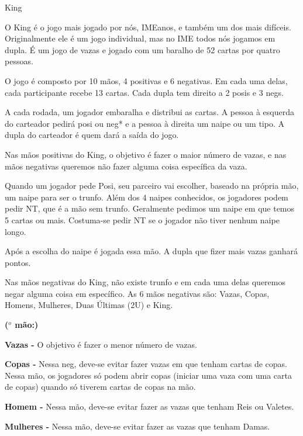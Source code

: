\begin{subsecao}{King}

O King é o jogo mais jogado por nós, IMEanos, e também um dos mais difíceis.
Originalmente ele é um jogo individual, mas no IME todos nós jogamos em
dupla. É um jogo de vazas e jogado com um baralho de 52 cartas por quatro
pessoas.

O jogo é composto por 10 mãos, 4 positivas e 6 negativas. Em cada uma delas,
cada participante recebe 13 cartas. Cada dupla tem direito a 2 posis e 3 negs.

A cada rodada, um jogador embaralha e distribui as cartas. A pessoa à esquerda
do carteador pedirá posi ou neg* e a pessoa à direita um naipe ou um tipo. A
dupla do carteador é quem dará a saída do jogo.

Nas mãos positivas do King, o objetivo é fazer o maior número de vazas, e nas
mãos negativas queremos não fazer alguma coisa específica da vaza.

Quando um jogador pede Posi, seu parceiro vai escolher, baseado na própria
mão, um naipe para ser o trunfo. Além dos 4 naipes conhecidos, os jogadores
podem pedir NT, que é a mão sem trunfo. Geralmente pedimos um naipe em que
temos 5 cartas ou mais. Costuma-se pedir NT se o jogador não tiver nenhum
naipe longo.

Após a escolha do naipe é jogada essa mão. A dupla que fizer mais vazas
ganhará pontos.

Nas mãos negativas do King, não existe trunfo e em cada uma delas queremos
negar alguma coisa em específico. As 6 mãos negativas são: Vazas, Copas,
Homens, Mulheres, Duas Últimas (2U) e King.


\begin{list}{\textbf{ ($^{o}$ mão:)}}{}

\item \textbf{Vazas -} O objetivo é fazer o menor número de vazas.

\item \textbf{Copas -}  Nessa neg, deve-se evitar fazer vazas em que tenham
cartas de copas. Nessa mão, os jogadores só podem abrir copas (iniciar uma
vaza com uma carta de copas) quando só tiverem cartas de copas na mão.

\item \textbf{Homem -} Nessa mão, deve-se evitar fazer as vazas que tenham
Reis ou Valetes.

\item \textbf{Mulheres -} Nessa mão, deve-se evitar fazer as vazas que
tenham Damas.


\end{list}
\end{subsecao}
